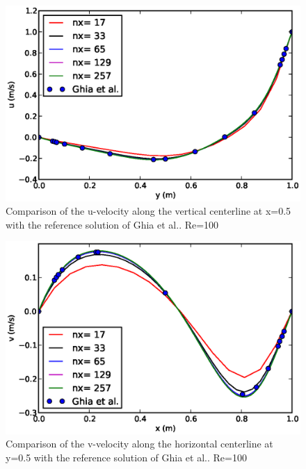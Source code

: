 \begin{figure}[H]
\centering
\includegraphics[scale=0.8]{"figs/uvel_100"}
\caption{Comparison of the u-velocity along the vertical centerline at x=0.5 with the reference solution of Ghia et al.. Re=100}
\label{fig:cavity_100_u}
\end{figure}
%
\begin{figure}[H]
\centering
\includegraphics[scale=0.8]{"figs/vvel_100"}
\caption{Comparison of the v-velocity along the horizontal centerline at y=0.5 with the reference solution of Ghia et al.. Re=100}
\label{fig:cavity_100_v}
\end{figure}
%
